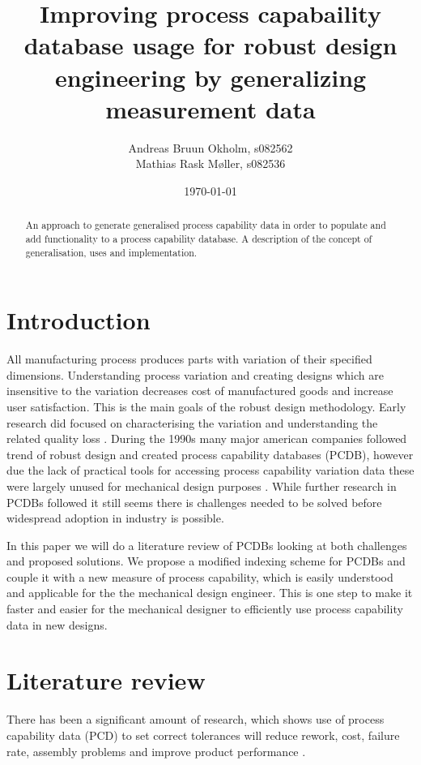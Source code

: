 \documentclass[aip,amsmath, reprint, author-year]{revtex4-1}
\begin{document}
\begin{abstract}
An approach to generate generalised process capability data in order to populate and add functionality to a process capability database.
A description of the concept of generalisation, uses and implementation.
\end{abstract}

\title{Improving process capabaility database usage for robust design engineering by generalizing measurement data}
\author{Andreas Bruun Okholm, s082562\\
Mathias Rask Møller, s082536 }
 
\date{\today}
\maketitle


\section{Introduction}

All manufacturing process produces parts with variation of their specified dimensions.  
Understanding process variation and creating designs which are insensitive to the variation decreases cost of manufactured goods and increase user satisfaction. 
This is the main goals of the robust design methodology. 
Early research did focused on characterising the variation and understanding the related quality loss \cite{taguchi1986introduction}. 
During the 1990s many major american companies followed trend of robust design and created process capability databases (PCDB), however due the lack of practical tools for accessing process capability variation data these were largely unused for mechanical design purposes \cite{tata1999process}. 
While further research in PCDBs followed it still seems there is challenges needed to be solved before widespread adoption in industry is possible. 

In this paper we will do a literature review of PCDBs looking at both challenges and proposed solutions. 
We propose a modified indexing scheme for PCDBs and couple it with a new measure of process capability, which is easily understood and applicable for the the mechanical design engineer. 
This is one step to make it faster and easier for the mechanical designer to efficiently use process capability data in new designs. 

\section{Literature review}
There has been a significant amount of research, which shows use of process capability data (PCD) to set correct tolerances will reduce rework, cost, failure rate, assembly problems and improve product performance \citep{tata1999process}.
\end{document}
